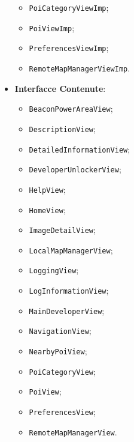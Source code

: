 \documentclass[../DefinizioneDiProdotto.tex]{subfiles}
\begin{document}
\begin{itemize}
\begin{itemize}
		\item \texttt{PoiCategoryViewImp};
		
		\item \texttt{PoiViewImp};
		
		\item \texttt{PreferencesViewImp};
		
		\item \texttt{RemoteMapManagerViewImp}.
		
	\end{itemize}
	\item \textbf{Interfacce Contenute}:
	\begin{itemize}
		\item \texttt{BeaconPowerAreaView};
		
		\item \texttt{DescriptionView};
		
		\item \texttt{DetailedInformationView};
		
		\item \texttt{DeveloperUnlockerView};
		
		\item \texttt{HelpView};
		
		\item \texttt{HomeView};
		
		\item \texttt{ImageDetailView};
		
		\item \texttt{LocalMapManagerView};
		
		\item \texttt{LoggingView};
		
		\item \texttt{LogInformationView};
		
		\item \texttt{MainDeveloperView};
		
		\item \texttt{NavigationView};
		
		\item \texttt{NearbyPoiView};
		
		\item \texttt{PoiCategoryView};
		
		\item \texttt{PoiView};
		
		\item \texttt{PreferencesView};
		
		\item \texttt{RemoteMapManagerView}.
		
	\end{itemize}
\end{itemize}
\end{document}
